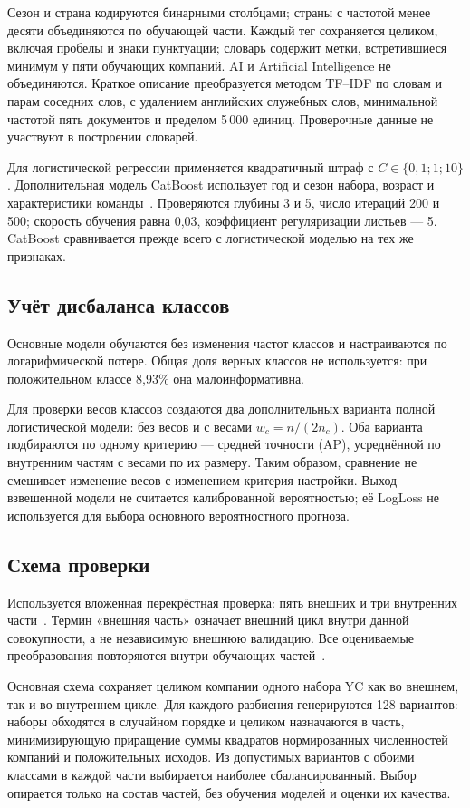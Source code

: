 Сезон и страна кодируются бинарными столбцами; страны с частотой менее десяти объединяются по обучающей части. Каждый тег сохраняется целиком, включая пробелы и знаки пунктуации; словарь содержит метки, встретившиеся минимум у пяти обучающих компаний. AI и Artificial Intelligence не объединяются. Краткое описание преобразуется методом TF--IDF по словам и парам соседних слов, с удалением английских служебных слов, минимальной частотой пять документов и пределом 5\,000 единиц. Проверочные данные не участвуют в построении словарей.

Для логистической регрессии применяется квадратичный штраф с $C\in\{0{,}1;1;10\}$. Дополнительная модель CatBoost использует год и сезон набора, возраст и характеристики команды~\cite{catboost-paper}. Проверяются глубины 3 и 5, число итераций 200 и 500; скорость обучения равна 0,03, коэффициент регуляризации листьев --- 5. CatBoost сравнивается прежде всего с логистической моделью на тех же признаках.

\subsection{Учёт дисбаланса классов}

Основные модели обучаются без изменения частот классов и настраиваются по логарифмической потере. Общая доля верных классов не используется: при положительном классе 8,93\% она малоинформативна.

Для проверки весов классов создаются два дополнительных варианта полной логистической модели: без весов и с весами $w_c=n/(2n_c)$. Оба варианта подбираются по одному критерию --- средней точности (AP), усреднённой по внутренним частям с весами по их размеру. Таким образом, сравнение не смешивает изменение весов с изменением критерия настройки. Выход взвешенной модели не считается калиброванной вероятностью; её LogLoss не используется для выбора основного вероятностного прогноза.

\subsection{Схема проверки}

Используется вложенная перекрёстная проверка: пять внешних и три внутренних части~\cite{sklearn-nested}. Термин «внешняя часть» означает внешний цикл внутри данной совокупности, а не независимую внешнюю валидацию. Все оцениваемые преобразования повторяются внутри обучающих частей~\cite{kapoor2023}.

Основная схема сохраняет целиком компании одного набора YC как во внешнем, так и во внутреннем цикле. Для каждого разбиения генерируются 128 вариантов: наборы обходятся в случайном порядке и целиком назначаются в часть, минимизирующую приращение суммы квадратов нормированных численностей компаний и положительных исходов. Из допустимых вариантов с обоими классами в каждой части выбирается наиболее сбалансированный. Выбор опирается только на состав частей, без обучения моделей и оценки их качества.

